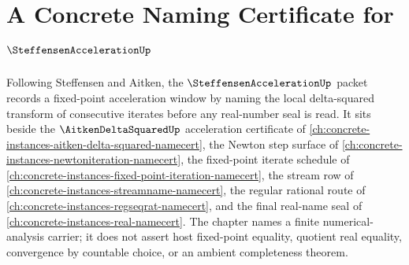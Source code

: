 \chapter{A Concrete Naming Certificate for $\SteffensenAccelerationUp$}
\label{ch:concrete-instances-steffensen-acceleration-namecert}

Following Steffensen and Aitken, the $\SteffensenAccelerationUp$ packet records a fixed-point acceleration window by naming the local delta-squared transform of consecutive iterates before any real-number seal is read. It sits beside the $\AitkenDeltaSquaredUp$ acceleration certificate of \autoref{ch:concrete-instances-aitken-delta-squared-namecert}, the Newton step surface of \autoref{ch:concrete-instances-newtoniteration-namecert}, the fixed-point iterate schedule of \autoref{ch:concrete-instances-fixed-point-iteration-namecert}, the stream row of \autoref{ch:concrete-instances-streamname-namecert}, the regular rational route of \autoref{ch:concrete-instances-regseqrat-namecert}, and the final real-name seal of \autoref{ch:concrete-instances-real-namecert}. The chapter names a finite numerical-analysis carrier; it does not assert host fixed-point equality, quotient real equality, convergence by countable choice, or an ambient completeness theorem.

